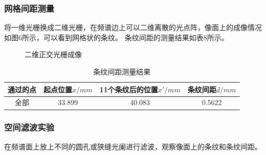 \documentclass{article}
\begin{document}
    \subsubsection{网格间距测量}
    将一维光栅换成二维光栅，在频谱边上可以二维离散的光点阵，像面上的成像情况如图6所示，可以看到网格状的条纹。
    条纹间距的测量结果如表8所示。
    \begin{figure}[h]
        \centering
        \caption{二维正交光栅成像}
    \end{figure}
    \begin{table}[h]
        \centering
        \begin{tabular}{ |c|c|c|c| }
            \hline
            通过的点 & 起点位置$x/mm$ & 11个条纹后的位置$x'/mm$ & 条纹间距$d/mm$ \\
            \hline
            全部 & 33.899 & 40.083 & 0.5622 \\
            \hline
        \end{tabular}
        \caption{条纹间距测量结果}
    \end{table}

    \subsubsection{空间滤波实验}
    在频谱面上放上不同的圆孔或狭缝光阑进行滤波，观察像面上的条纹和条纹间距。
\end{document}
